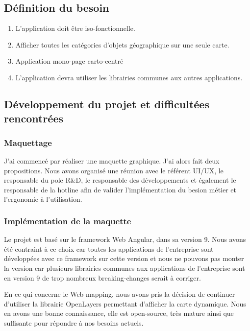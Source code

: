 \documentclass{rapportUHA40}
\begin{document}
\subsection{Définition du besoin}
\begin{enumerate}
  \item L'application doit être iso-fonctionnelle.
  \item Afficher toutes les catégories d'objets géographique sur une seule carte.
  \item Application mono-page carto-centré
  \item L'application devra utiliser les librairies communes aux autres applications.
\end{enumerate}

\subsection{Développement du projet et difficultées rencontrées}
\subsubsection{Maquettage}
J'ai commencé par réaliser une maquette graphique. J'ai alors fait deux
propositions. Nous avons organisé une réunion avec le référent UI/UX, le
responsable du pole R\&D, le responsable des développements et également le
responsable de la hotline afin de valider l'implémentation du besion métier et
l'ergonomie à l'utilisation.

\newpage
\subsubsection{Implémentation de la maquette}
Le projet est basé sur le framework Web Angular, dans sa version 9. Nous avons
été contraint à ce choix car toutes les applications de l'entreprise sont
développées avec ce framework sur cette version et nous ne pouvons pas monter
la version car plusieurs librairies communes aux applications de l'entreprise
sont en version 9 de trop nombreux breaking-changes serait à corriger.

En ce qui concerne le Web-mapping, nous avons pris la décision de continuer
d'utiliser la librairie OpenLayers permettant d'afficher la carte dynamique.
Nous en avons une bonne connaissance, elle est open-source, très mature ainsi
que suffisante pour répondre à nos besoins actuels.
\end{document}
